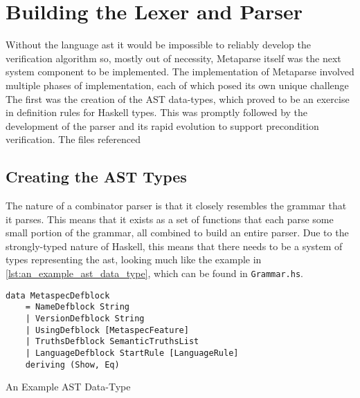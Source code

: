 \section{Building the Lexer and Parser} %
\label{sec:building_the_lexer_and_parser}

Without the language \gls{ast} it would be impossible to reliably develop the verification algorithm so, mostly out of necessity, Metaparse itself was the next system component to be implemented. 
The implementation of Metaparse involved multiple phases of implementation, each of which posed its own unique challenge
The first was the creation of the AST data-types, which proved to be an exercise in definition rules for Haskell types.
This was promptly followed by the development of the parser and its rapid evolution to support precondition verification.
The files referenced 

\subsection{Creating the AST Types} %
\label{sub:creating_the_ast_types}
The nature of a combinator parser is that it closely resembles the grammar that it parses. 
This means that it exists as a set of functions that each parse some small portion of the grammar, all combined to build an entire parser. 
Due to the strongly-typed nature of Haskell, this means that there needs to be a system of types representing the \gls{ast}, looking much like the example in \autoref{lst:an_example_ast_data_type}, which can be found in \texttt{Grammar.hs}.\\

\begin{listing}[!htb]
\begin{verbatim}
data MetaspecDefblock
    = NameDefblock String
    | VersionDefblock String
    | UsingDefblock [MetaspecFeature]
    | TruthsDefblock SemanticTruthsList
    | LanguageDefblock StartRule [LanguageRule]
    deriving (Show, Eq)    
\end{verbatim}
\caption{An Example AST Data-Type}
\label{lst:an_example_ast_data_type}
\end{listing}

